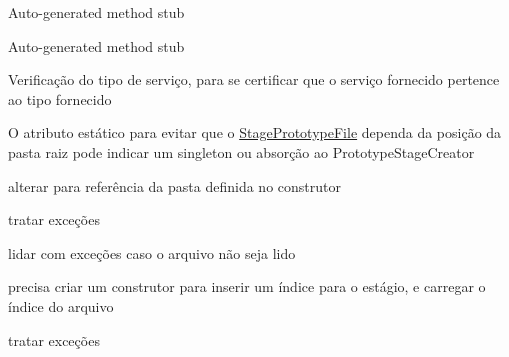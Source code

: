 \begin{DoxyRefList}
\label{todo__todo000016}%
%
Auto-\/generated method stub  
\item[Membro \mbox{\hyperlink{classbr_1_1unicamp_1_1mc322_1_1projeto_1_1gameengine_1_1service_1_1keyinput_1_1_scanner_input_service_a1e3e57e7e6eca08dc714140ea24414da}{br.unicamp.mc322.projeto.gameengine.service.keyinput.Scanner\+Input\+Service.end}} ()]\label{todo__todo000018}%
%
Auto-\/generated method stub  
\item[Membro \mbox{\hyperlink{classbr_1_1unicamp_1_1mc322_1_1projeto_1_1gameengine_1_1service_1_1_service_manager_a81e8c1a9bf762ead74b350849ec3b79b}{br.unicamp.mc322.projeto.gameengine.service.Service\+Manager.insert\+Service}} (\mbox{\hyperlink{interfacebr_1_1unicamp_1_1mc322_1_1projeto_1_1gameengine_1_1service_1_1_service}{Service}} service, \mbox{\hyperlink{enumbr_1_1unicamp_1_1mc322_1_1projeto_1_1gameengine_1_1service_1_1_service_type}{Service\+Type}} service\+Type)]\label{todo__todo000019}%
%
Verificação do tipo de serviço, para se certificar que o serviço fornecido pertence ao tipo fornecido  
\item[Classe \mbox{\hyperlink{classbr_1_1unicamp_1_1mc322_1_1projeto_1_1gameengine_1_1service_1_1stagecreator_1_1_prototype_loader}{br.unicamp.mc322.projeto.gameengine.service.stagecreator.Prototype\+Loader}} ]\label{todo__todo000020}%
%
O atributo estático para evitar que o \mbox{\hyperlink{classbr_1_1unicamp_1_1mc322_1_1projeto_1_1gameengine_1_1service_1_1stagecreator_1_1_stage_prototype_file}{Stage\+Prototype\+File}} dependa da posição da pasta raiz pode indicar um singleton ou absorção ao Prototype\+Stage\+Creator  
\item[Membro \mbox{\hyperlink{classbr_1_1unicamp_1_1mc322_1_1projeto_1_1gameengine_1_1service_1_1stagecreator_1_1_prototype_loader_a33ed98ae7dd0aa7f45a3a129de085456}{br.unicamp.mc322.projeto.gameengine.service.stagecreator.Prototype\+Loader.load}} (String dir)]\label{todo__todo000021}%
%
alterar para referência da pasta definida no construtor 

\label{todo__todo000022}%
%
tratar exceções 

\label{todo__todo000023}%
%
lidar com exceções caso o arquivo não seja lido 

\label{todo__todo000024}%
%
precisa criar um construtor para inserir um índice para o estágio, e carregar o índice do arquivo  
\item[Membro \mbox{\hyperlink{classbr_1_1unicamp_1_1mc322_1_1projeto_1_1gameengine_1_1service_1_1stagecreator_1_1_prototype_loader_ad8fc11cd6fa9e88d62d64945f56ff143}{br.unicamp.mc322.projeto.gameengine.service.stagecreator.Prototype\+Loader.load\+Arg}} (Node node)]\label{todo__todo000026}%
%
tratar exceções 


\end{DoxyRefList}
